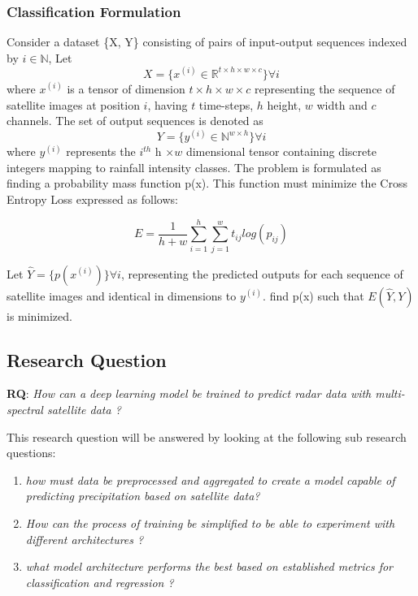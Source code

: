 \subsubsection[short]{Classification Formulation}
Consider a dataset \{X, Y\} consisting of pairs of input-output sequences indexed by $i \in \mathbb{N}$,
Let $$X = \{x^{(i)} \in \mathbb{R}^{t \times h \times w \times c}\} \forall i$$ 
where $x^{(i)}$ is a tensor of dimension $t \times h \times w \times c$ representing the sequence of satellite images at position $i$, having $t$ time-steps, $h$ height, $w$ width and $c$ channels.
The set of output sequences is denoted as $$Y = \{y^{(i)} \in \mathbb{N}^{w\times h}\}\forall i$$
where $y^{(i)}$ represents the $i^{th}$ h $\times w$ dimensional tensor containing discrete integers mapping to rainfall intensity classes.
The problem is formulated as finding a probability mass function p(x). This function must minimize the Cross Entropy Loss expressed as follows:

$$E = \frac{1}{h+w}\sum_{i=1}^h\sum_{j=1}^w t_{ij} log(p_{ij})$$

Let $\hat{Y} = \{p(x^{(i)})\}\forall i$, representing the predicted outputs for each sequence of satellite images and identical in dimensions to $y^{(i)}$.
find p(x) such that $E(\hat{Y}, Y)$ is minimized.

\subsection{Research Question}
\textbf{RQ}: \textit{How can a deep learning model be trained to predict radar data with multi-spectral satellite data ?}
\medskip

This research question will be answered by looking at the following sub research questions:
\begin{enumerate}
    \item \textit{how must data be preprocessed and aggregated to create a model capable of predicting precipitation based on satellite data?}
    \item \textit{How can the process of training be simplified to be able to experiment with different architectures ?}
    \item \textit{what model architecture performs the best based on established metrics for classification and regression ?}
\end{enumerate}